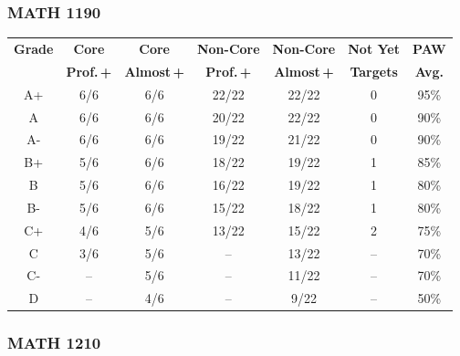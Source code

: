 \documentclass[12pt]{article}
\begin{document}

        \subsubsection{MATH 1190}

\begin{center}
\renewcommand{\arraystretch}{1.2}
\begin{tabular}{c c c c c c c}
\toprule
\textbf{Grade} &
\textbf{Core} &
\textbf{Core} &
\textbf{Non-Core} &
\textbf{Non-Core} &
\textbf{Not Yet} &
\textbf{PAW} \\

&
\textbf{Prof.\,+} &
\textbf{Almost\,+} &
\textbf{Prof.\,+} &
\textbf{Almost\,+} &
\textbf{Targets} &
\textbf{Avg.} \\
\midrule
A+ & 6/6 & 6/6 & 22/22 & 22/22 & 0 & 95\% \\
A  & 6/6 & 6/6 & 20/22 & 22/22 & 0 & 90\% \\
A- & 6/6 & 6/6 & 19/22 & 21/22 & 0 & 90\% \\
B+ & 5/6 & 6/6 & 18/22 & 19/22 & 1 & 85\% \\
B  & 5/6 & 6/6 & 16/22 & 19/22 & 1 & 80\% \\
B- & 5/6 & 6/6 & 15/22 & 18/22 & 1 & 80\% \\
C+ & 4/6 & 5/6 & 13/22 & 15/22 & 2 & 75\% \\
C  & 3/6 & 5/6 & --    & 13/22 & -- & 70\% \\
C- & --  & 5/6 & --    & 11/22 & -- & 70\% \\
D  & --  & 4/6 & --    & 9/22  & -- & 50\% \\
\bottomrule
\end{tabular}
\end{center}

     
        
\subsubsection{MATH 1210}
  
\end{document}

